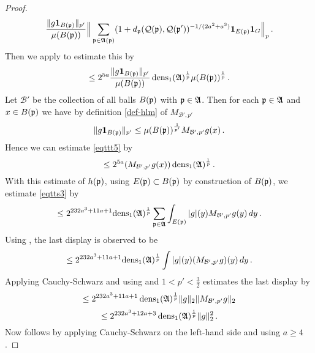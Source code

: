 \begin{proof}
\begin{equation}
    \frac{\|g\mathbf{1}_{B({\mathfrak p})}\|_{p'}}{\mu(B({\mathfrak p}))}
    \Big\|\sum_{{\mathfrak p}\in\mathfrak{A}({\mathfrak p})}(1+d_{{\mathfrak p}}({\mathcal{Q}}({\mathfrak p}), {\mathcal{Q}}({\mathfrak p}'))^{-1/(2a^2+a^3)}\mathbf{1}_{E({\mathfrak p})}\mathbf{1}_G\Big\|_{p}\, .
\end{equation}
Then we apply  to estimate this by
\begin{equation}\label{eqttt5}
    \le 2^{5a}
    \frac{\|g\mathbf{1}_{B({\mathfrak p})}\|_{p'}}{\mu(B({\mathfrak p}))}
    \operatorname{\operatorname{dens}}_1(\mathfrak{A})^{\frac 1p}\mu(B({\mathfrak p}))^{\frac 1p}\,.
\end{equation}
Let $\mathcal{B}'$ be the collection of all balls
$B({\mathfrak p})$ with ${\mathfrak p}\in \mathfrak{A}$. Then
for each ${\mathfrak p}\in \mathfrak{A}$ and $x\in B({\mathfrak p})$ we have by
definition \eqref{def-hlm} of $M_{\mathcal{B}',p'}$
\begin{equation}
    \|g\mathbf{1}_{B({\mathfrak p})}\|_{p'}\le
    \mu(B({\mathfrak p}))^{\frac 1{p'}} M_{\mathcal{B}',p'}g(x) \, .
\end{equation}
Hence we can estimate \eqref{eqttt5} by
\begin{equation}
\label{eqttt5b}
    \le
    2^{5a}
    (M_{\mathcal{B}', p'}g(x))
   \operatorname{\operatorname{dens}}_1(\mathfrak{A})^{\frac 1p}\, .
\end{equation}
With this estimate of $h({\mathfrak p})$, using $E({\mathfrak p})\subset B({\mathfrak p})$ by construction of $B({\mathfrak p})$, we estimate \eqref{eqtts3} by
 \begin{equation}\label{eqtts4}
 \le 2^{232a^3+11a + 1} { \operatorname{\operatorname{dens}}_1(\mathfrak{A})^{\frac 1p}}\sum_{{\mathfrak p}\in \mathfrak{A}}
 \int_{E({\mathfrak p})}|g|(y)M_{\mathcal{B}', p'}g(y) \, dy\,.
         \end{equation}
Using , the last display is observed to be
\begin{equation}\label{eqtts4a}
\le 2^{232a^3+11a + 1}
 {\operatorname{\operatorname{dens}}_1(\mathfrak{A})^{\frac 1p}} \int |g|(y)(M_{\mathcal{B}', p'}g)(y) \, dy\,.
         \end{equation}
Applying Cauchy-Schwarz and using  and $1<p'<\frac 32$ estimates the last display by
\begin{equation}
    \le 2^{232a^3+11a + 1} \operatorname{\operatorname{dens}}_1(\mathfrak{A})^{\frac 1p}
    \|g\|_2 \|M_{\mathcal{B}', p'} g\|_2
\end{equation}
\begin{equation}
    \le 2^{232a^3+12a+3} \operatorname{\operatorname{dens}}_1(\mathfrak{A})^{\frac 1p}\|g\|_2 ^2\,.
\end{equation}
Now  follows by applying Cauchy-Schwarz on the left-hand side and using $a\ge 4$.
\end{proof}
